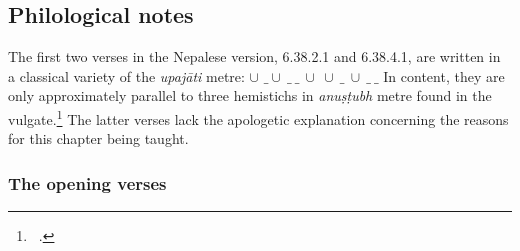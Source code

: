     
    \subsection{Philological notes}
    
The first two verses in the Nepalese version, 6.38.2.1 and 6.38.4.1, are
written in a classical variety of the \emph{upajāti} metre:
\underline{$\cup$} $\_ \cup\ \_\ \_\ \cup\ \cup\ \_\ \cup\ \_\ \_$ In
content, they are only approximately parallel to three hemistichs in
\emph{anuṣṭubh} metre found in the vulgate.\footnote{\SS\ 
.}
The
latter verses lack the apologetic explanation concerning the reasons for
this chapter being taught.
        
\subsubsection{The opening verses}

